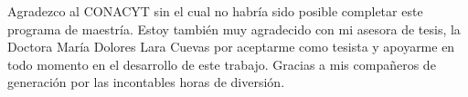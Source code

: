 Agradezco al CONACYT sin el cual no habría sido posible completar este programa de 
maestría. Estoy también muy agradecido con mi asesora de tesis, la Doctora María Dolores
Lara Cuevas por aceptarme como tesista y apoyarme en todo momento en el desarrollo de
este trabajo. Gracias a mis compañeros de generación por las incontables horas de
diversión.
